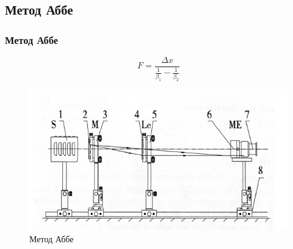 \documentclass[10pt,pdf,hyperref={unicode}]{beamer}
\begin{document}
\begin{frame}
\section{Метод Аббе}
\frametitle{Метод Аббе} 


\begin{equation}
	F = \frac{\Delta x}{\frac{1}{\beta_1} - \frac{1}{\beta_2}}
	\label{eq:1}
\end{equation}

\begin{figure}[H]
	\centering
	\includegraphics[width=0.7\linewidth]{4}
	\caption{Метод Аббе} %
	\label{fig:2}
\end{figure}
\end{frame}
\end{document}
